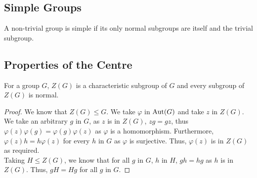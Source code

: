 \subsection{Simple Groups}

A non-trivial group is simple if its only normal subgroups are itself 
and the trivial subgroup.

\subsection{Properties of the Centre}

For a group $G$, $Z(G)$ is a characteristic subgroup of $G$ and every
subgroup of $Z(G)$ is normal.

\begin{proof}
    We know that $Z(G) \leq G$. We take $\varphi$ in $\operatorname{Aut}(G)$ and take $z$
    in $Z(G)$. We take an arbitrary $g$ in $G$, as $z$ is in $Z(G)$, 
    $zg = gz$, thus $\varphi(z)\varphi(g) = \varphi(g)\varphi(z)$ as 
    $\varphi$ is a homomorphism. Furthermore, $\varphi(z)h = h\varphi(z)$
    for every $h$ in $G$ as $\varphi$ is surjective. Thus, $\varphi(z)$
    is in $Z(G)$ as required.
    \\[\baselineskip]
    Taking $H \leq Z(G)$, we know that for all $g$ in $G$, $h$ in $H$,
    $gh = hg$ as $h$ is in $Z(G)$. Thus, $gH = Hg$ for all $g$ in $G$.
\end{proof}
